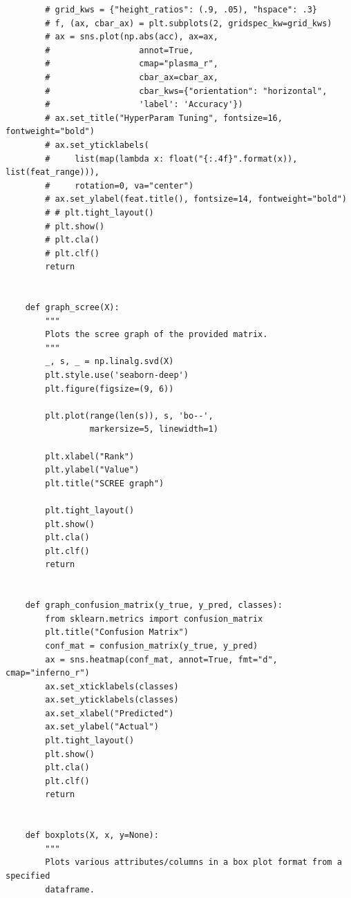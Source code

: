 \documentclass{article}
\begin{document}
\begin{verbatim}
        # grid_kws = {"height_ratios": (.9, .05), "hspace": .3}
        # f, (ax, cbar_ax) = plt.subplots(2, gridspec_kw=grid_kws)
        # ax = sns.plot(np.abs(acc), ax=ax,
        #                  annot=True,
        #                  cmap="plasma_r",
        #                  cbar_ax=cbar_ax,
        #                  cbar_kws={"orientation": "horizontal",
        #                  'label': 'Accuracy'})
        # ax.set_title("HyperParam Tuning", fontsize=16, fontweight="bold")
        # ax.set_yticklabels(
        #     list(map(lambda x: float("{:.4f}".format(x)), list(feat_range))),
        #     rotation=0, va="center")
        # ax.set_ylabel(feat.title(), fontsize=14, fontweight="bold")
        # # plt.tight_layout()
        # plt.show()
        # plt.cla()
        # plt.clf()
        return
    
    
    def graph_scree(X):
        """
        Plots the scree graph of the provided matrix.
        """
        _, s, _ = np.linalg.svd(X)
        plt.style.use('seaborn-deep')
        plt.figure(figsize=(9, 6))
    
        plt.plot(range(len(s)), s, 'bo--',
                 markersize=5, linewidth=1)
    
        plt.xlabel("Rank")
        plt.ylabel("Value")
        plt.title("SCREE graph")
    
        plt.tight_layout()
        plt.show()
        plt.cla()
        plt.clf()
        return
    
    
    def graph_confusion_matrix(y_true, y_pred, classes):
        from sklearn.metrics import confusion_matrix
        plt.title("Confusion Matrix")
        conf_mat = confusion_matrix(y_true, y_pred)
        ax = sns.heatmap(conf_mat, annot=True, fmt="d", cmap="inferno_r")
        ax.set_xticklabels(classes)
        ax.set_yticklabels(classes)
        ax.set_xlabel("Predicted")
        ax.set_ylabel("Actual")
        plt.tight_layout()
        plt.show()
        plt.cla()
        plt.clf()
        return
    
    
    def boxplots(X, x, y=None):
        """
        Plots various attributes/columns in a box plot format from a specified
        dataframe.
    

\end{verbatim}
\end{document}
